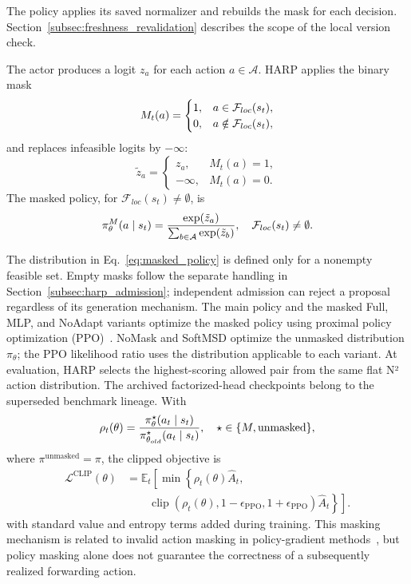 \documentclass[final,5p]{elsarticle}
\newcommand{\rev}[1]{\textcolor{revisiongreen}{#1}}
\let\newrev\rev
\begin{document}
\newrev{The policy applies its saved normalizer and rebuilds the mask for each decision. Section~\ref{subsec:freshness_revalidation} describes the scope of the local version check.}

The actor produces a logit \(z_a\) for each action \(a\in\mathcal{A}\). HARP applies the binary mask
\begin{equation}
M_t(a)=
\begin{cases}
1, & \rev{a\in\mathcal{F}_{loc}(s_t)},\\
0, & \rev{a\notin\mathcal{F}_{loc}(s_t)},
\end{cases}
\end{equation}
and replaces infeasible logits by \(-\infty\):
\begin{equation}
\tilde{z}_a=
\begin{cases}
z_a, & M_t(a)=1,\\
-\infty, & M_t(a)=0.
\end{cases}
\end{equation}
\newrev{The masked policy, for \(\mathcal F_{loc}(s_t)\ne\emptyset\), is}
\begin{equation}
\newrev{\pi_\theta^{M}(a\mid s_t)=\frac{\exp(\tilde{z}_a)}{\sum_{b\in\mathcal{A}}\exp(\tilde{z}_b)},\quad\mathcal F_{loc}(s_t)\ne\emptyset.}\label{eq:masked_policy}
\end{equation}

\newrev{The distribution in Eq.~\eqref{eq:masked_policy} is defined only for a nonempty feasible set. Empty masks follow the separate handling in Section~\ref{subsec:harp_admission}; independent admission can reject a proposal regardless of its generation mechanism. The main policy and the masked Full, MLP, and NoAdapt variants optimize the masked policy using proximal policy optimization (PPO)~\cite{schulman2017proximal}. NoMask and SoftMSD optimize the unmasked distribution \(\pi_\theta\); the PPO likelihood ratio uses the distribution applicable to each variant. At evaluation, HARP selects the highest-scoring allowed pair from the same flat N² action distribution. The archived factorized-head checkpoints belong to the superseded benchmark lineage.} With
\begin{equation}
\color{revisiongreen}
    \rho_t(\theta)=
    \frac{\pi_\theta^{\star}(a_t\mid s_t)}
    {\pi_{\theta_{old}}^{\star}(a_t\mid s_t)},\quad\star\in\{M,\mathrm{unmasked}\},
\end{equation}
where \(\pi^{\mathrm{unmasked}}=\pi\), the clipped objective is
\begin{equation}
\begin{aligned}
\mathcal{L}^{\mathrm{CLIP}}(\theta)
&=\mathbb{E}_t\!\left[\min\left\{\rho_t(\theta)\hat A_t,\right.\right.\\
&\qquad\left.\left.\operatorname{clip}\!\left(\rho_t(\theta),1-\epsilon_{\mathrm{PPO}},
1+\epsilon_{\mathrm{PPO}}\right)\hat A_t\right\}\right].
\end{aligned}
\label{eq:ppo_clip}
\end{equation}
with standard value and entropy terms added during training. This masking mechanism is related to invalid action masking in policy-gradient methods~\cite{huang2022closer}, \rev{but policy masking alone does not guarantee the correctness of a subsequently realized forwarding action}.
\end{document}
